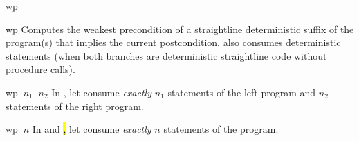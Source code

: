 \begin{tactic}{wp}
  \begin{tsyntax}{wp}
  Computes the weakest precondition of a straightline deterministic
  suffix of the program(s) that implies the current
  postcondition.  also consumes deterministic 
  statements (when both branches are deterministic straightline code
  without procedure calls).
  \end{tsyntax}

  \begin{tsyntax}{wp $\ n_1$ $\ n_2$}
  In \prhl, let  consume \emph{exactly} $n_1$ statements of
  the left program and $n_2$ statements of the right program.
  \end{tsyntax}

  \begin{tsyntax}{wp $\ n$}
  In \phl and \hl, let  consume \emph{exactly} $n$ statements
  of the program.
  \end{tsyntax}
\end{tactic}
